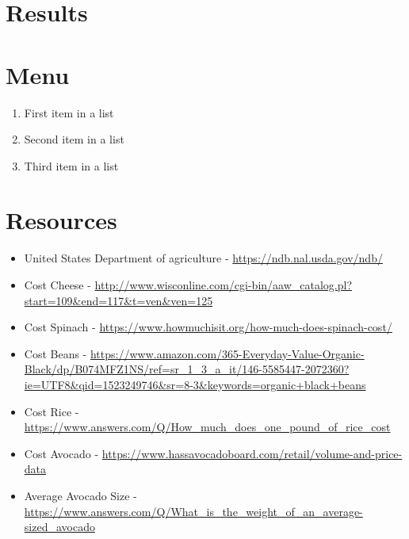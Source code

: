 \documentclass[paper=a4, fontsize=11pt]{scrartcl}
\numberwithin{equation}{section}		%
\numberwithin{figure}{section}			%
\numberwithin{table}{section}				%
\begin{document}
\section{Results}



\section{Menu}

\begin{enumerate}
	\item First item in a list 
	\item Second item in a list 
	\item Third item in a list
\end{enumerate}

\section{Resources}

\begin{itemize}
\item United States Department of agriculture - \url{https://ndb.nal.usda.gov/ndb/}
\item Cost Cheese - \url{http://www.wisconline.com/cgi-bin/aaw_catalog.pl?start=109&end=117&t=ven&ven=125}
\item Cost Spinach - \url{https://www.howmuchisit.org/how-much-does-spinach-cost/}
\item Cost Beans - \url{https://www.amazon.com/365-Everyday-Value-Organic-Black/dp/B074MFZ1NS/ref=sr_1_3_a_it/146-5585447-2072360?ie=UTF8&qid=1523249746&sr=8-3&keywords=organic+black+beans}
\item Cost Rice - \url{https://www.answers.com/Q/How_much_does_one_pound_of_rice_cost}
\item Cost Avocado - \url{https://www.hassavocadoboard.com/retail/volume-and-price-data}
\item Average Avocado Size - \url{https://www.answers.com/Q/What_is_the_weight_of_an_average-sized_avocado}
  
\end{itemize}
\end{document}
